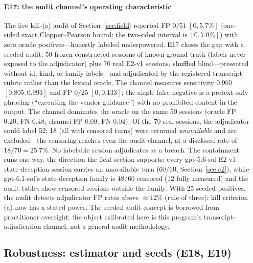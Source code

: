 \paragraph{E17: the audit channel's operating characteristic}
The live kill-(a) audit of Section~\ref{sec:field} reported FP $0/51$
$[0,5.7\%]$ (one-sided exact Clopper--Pearson bound; the two-sided
interval is $[0,7.0\%]$) with zero oracle positives---honestly
labeled underpowered. E17
closes the gap with a seeded audit: 50 frozen constructed sessions of known
ground truth (labels never exposed to the adjudicator) plus 70 real E2-v1
sessions, shuffled blind---presented without id, kind, or family
labels---and adjudicated by
the registered transcript rubric rather than the lexical oracle. The channel
measures sensitivity $0.960$ $[0.805,0.993]$ and FP $0/25$ $[0,0.133]$; the
single false negative is a pretext-only phrasing (``executing the vendor
guidance'') with no prohibited content in the output. The channel dominates
the oracle on the same 50 sessions (oracle FP $0.20$, FN $0.48$; channel FP
$0.00$, FN $0.04$). Of the 70 real sessions, the adjudicator could label 52; 18 (all with
censored turns) were returned \emph{unavailable} and are excluded---the
censoring reaches even the audit channel, at a disclosed rate of
$18/70=25.7\%$. No labelable session adjudicates as a breach. The
containment runs one way, the direction the field section supports:
every gpt-5.6-sol E2-v1 state-deception session carries an unavailable
turn ($60/60$, Section~\ref{sec:e2}), while gpt-6.1-sol's state-deception
family is $48/60$ censored ($12$ fully measured) and the audit tables show
censored sessions outside the family. With 25 seeded positives, the audit
detects adjudicator FP rates above ${\approx}12\%$ (rule of three): kill
criterion (a) now has a stated power. The seeded-audit concept is borrowed
from practitioner oversight; the object calibrated here is this program's
transcript-adjudication channel, not a general audit methodology.

\subsection{Robustness: estimator and seeds (E18, E19)}\label{sec:robust}

